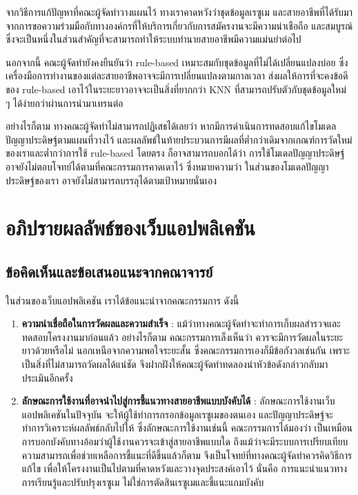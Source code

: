 \par{
    จากวิธีการแก้ปัญหาที่คณะผู้จัดทำวางแผนไว้ ทางเราคาดหวังว่าชุดข้อมูลเรซูเม และสายอาชีพที่ได้รับมาจากการขอความร่วมมือกับทางองค์กรที่ให้บริการเกี่ยวกับการสมัครงานจะมีความน่าเชือถือ และสมบูรณ์ ซึ่งจะเป็นหนึ่งในส่วนสำคัญที่จะสามารถทำให้ระบบทำนายสายอาชีพมีความแม่นยำต่อไป
}
\par{
    นอกจากนี้ คณะผู้จัดทำยังคงยืนยันว่า rule-based เหมาะสมกับชุดข้อมูลที่ไม่ได้เปลี่ยนแปลงบ่อย ซึ่งเครื่องมือการทำงานของแต่ละสายอาชีพอาจจะมีการเปลี่ยนแปลงตามกาลเวลา ส่งผลให้การที่จะคงข้อดีของ  rule-based เอาไว้ในระยะยาวอาจจะเป็นสิ่งที่ยากกว่า KNN ที่สามารถปรับตัวกับชุดข้อมูลใหม่ ๆ ได้ง่ายกว่าผ่านการนำมาเทรนต่อ

}
\par{
    อย่างไรก็ตาม ทางคณะผู้จัดทำไม่สามารถปฏิเสธได้เลยว่า หากมีการดำเนินการทดสอบแก้ไขโมเดลปัญญาประดิษฐ์ตามแผนที่วางไว้ และผลลัพธ์ในท้ายประบวนการมีผลที่ต่ำกว่าเดิมจากเกณฑ์การวัดใหม่ของเราและต่ำกว่าการใช้ rule-based โดยตรง ก็อาจสามารถบอกได้ว่า การใช้โมเดลปัญญาประดิษฐ์อาจยังไม่ตอบโจทย์ได้ตามที่คณะกรรมการคาดเดาไว้ ซึ่งหมายความว่า ในส่วนของโมเดลปัญญาประดิษฐ์ของเรา อาจยังไม่สามารถบรรลุได้ตามเป้าหมายนั่นเอง
}







\section{อภิปรายผลลัพธ์ของเว็บแอปพลิเคชัน}
\subsection{ข้อคิดเห็นและข้อเสนอแนะจากคณาจารย์}
ในส่วนของเว็บแอปพลิเคชัน เราได้ข้อแนะนำจากคณะกรรมการ ดังนี้

\begin{enumerate}
    \item \textbf{ความน่าเชื่อถือในการวัดผลและความสำเร็จ} : แม้ว่าทางคณะผู้จัดทำจะทำการเก็บผลสำรวจและทดสอบโครงงานมาก่อนแล้ว อย่างไรก็ตาม คณะกรรมการเล็งเห็นว่า ควรจะมีการวัดผลในระยะยาวด้วยหรือไม่ นอกเหนือจากความพอใจระยะสั้น ซึ่งคณะกรรมการเองก็มีข้อกังวลเช่นกัน เพราะเป็นสิ่งที่ไม่สามารถวัดผลได้แน่ชัด จึงฝากฝังให้คณะผู้จัดทำทดลองนำหัวข้อดังกล่าวกลับมาประเมินอีกครั้ง
    \item \textbf{ลักษณะการใช้งานที่อาจนำไปสู่การชี้แนวทางสายอาชีพแบบบังคับได้} : ลักษณะการใช้งานเว็บแอปพลิเคชันในปัจจุบัน จะให้ผู้ใช้ทำการกรอกข้อมูลเรซูเมของตนเอง และปัญญาประดิษฐ์จะทำการวิเคราะห์ผลลัพธ์กลับไปให้ ซึ่งลักษณะการใช้งานเช่นนี้ คณะกรรมการได้มองว่า เป็นเหมือนการบอกบังคับทางอ้อมว่าผู้ใช้งานควรจะเข้าสู่สายอาชีพแบบใด ถึงแม้ว่าจะมีระบบการเปรียบเทียบความสามารถเพื่อช่วยเหลือการชี้แนะที่ดีขึ้นแล้วก็ตาม จึงเป็นโจทย์ที่ทางคณะผู้จัดทำควรคิดวิธีการแก้ไข เพื่อให้โครงงานเป็นไปตามที่คาดหวังและวางจุดประสงค์เอาไว้ นั่นคือ การแนะนำแนวทางการเรียนรู้และปรับปรุงเรซูเม ไม่ใช่การตัดสินเรซูเมและชี้แนะแกมบังคับ
\end{enumerate}

